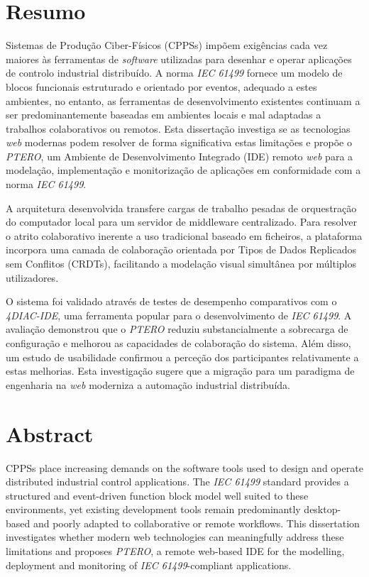 \chapter*{Resumo}
Sistemas de Produção Ciber-Físicos (\acsp{CPPS}) impõem exigências cada vez maiores às ferramentas de \textit{software} utilizadas para desenhar e operar aplicações de controlo industrial distribuído. A norma \textit{IEC 61499} fornece um modelo de blocos funcionais estruturado e orientado por eventos, adequado a estes ambientes, no entanto, as ferramentas de desenvolvimento existentes continuam a ser predominantemente baseadas em ambientes locais e mal adaptadas a trabalhos colaborativos ou remotos. Esta dissertação investiga se as tecnologias \textit{web} modernas podem resolver de forma significativa estas limitações e propõe o \textit{PTERO}, um Ambiente de Desenvolvimento Integrado (\acs{IDE}) remoto \textit{web} para a modelação, implementação e monitorização de aplicações em conformidade com a norma \textit{IEC 61499}.

A arquitetura desenvolvida transfere cargas de trabalho pesadas de orquestração do computador local para um servidor de middleware centralizado. Para resolver o atrito colaborativo inerente a uso tradicional baseado em ficheiros, a plataforma incorpora uma camada de colaboração orientada por Tipos de Dados Replicados sem Conflitos (\acsp{CRDT}), facilitando a modelação visual simultânea por múltiplos utilizadores.

O sistema foi validado através de testes de desempenho comparativos com o \textit{4DIAC-IDE}, uma ferramenta popular para o desenvolvimento de \textit{IEC 61499}. A avaliação demonstrou que o \textit{PTERO} reduziu substancialmente a sobrecarga de configuração e melhorou as capacidades de colaboração do sistema. Além disso, um estudo de usabilidade confirmou a perceção dos participantes relativamente a estas melhorias. Esta investigação sugere que a migração para um paradigma de engenharia na \textit{web} moderniza a automação industrial distribuída.

\acresetall %

\chapter*{Abstract}
\acp{CPPS} place increasing demands on the software tools used to design and operate distributed industrial control applications. The \textit{IEC 61499} standard provides a structured and event-driven function block model well suited to these environments, yet existing development tools remain predominantly desktop-based and poorly adapted to collaborative or remote workflows. This dissertation investigates whether modern web technologies can meaningfully address these limitations and proposes \textit{PTERO}, a remote web-based \ac{IDE} for the modelling, deployment and monitoring of \textit{IEC 61499}-compliant applications.


